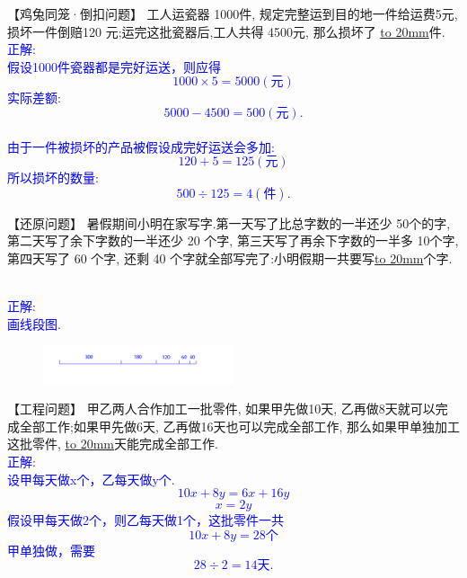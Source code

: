 \item {
    【鸡兔同笼·倒扣问题】
    工人运瓷器 1000件, 规定完整运到目的地一件给运费5元, 损坏一件倒赔120 元;运完这批瓷器后,工人共得 4500元, 那么损坏了 \underline{\hbox to 20mm{}}件.
    \ifshowSolution{}
        \fangsong{}\textcolor{blue}{
            \\正解:\\
            假设1000件瓷器都是完好运送，则应得\\
            \[1000\times 5 = 5000(元)\]
            实际差额: 
            \[5000-4500=500(元).\] \\
            由于一件被损坏的产品被假设成完好运送会多加:
            \[120+5=125(元)\]
            所以损坏的数量:
            \[500\div 125 = 4(件).\]
        }
    \else
        \vspace{2cm}
    \fi
}

\item {
    【还原问题】
    暑假期间小明在家写字.第一天写了比总字数的一半还少 50个的字, 第二天写了余下字数的一半还少 20 个字, 第三天写了再余下字数的一半多 10个字, 第四天写了 60 个字, 还剩 40 个字就全部写完了:小明假期一共要写\underline{\hbox to 20mm{}}个字.
    \ifshowSolution{}
        \fangsong{}\textcolor{blue}{
            \\正解:\\
            画线段图.
            \begin{figure}[H] 
                \centering
                \includegraphics[width=0.5\textwidth]{./pics/Chapter_3/seikai_9.png}
            \end{figure}
        }
    \else
        \vspace{2cm}
    \fi
}

\item {
    【工程问题】
    甲乙两人合作加工一批零件, 如果甲先做10天, 乙再做8天就可以完成全部工作;如果甲先做6天, 乙再做16天也可以完成全部工作, 那么如果甲单独加工这批零件, \underline{\hbox to 20mm{}}天能完成全部工作.
    \ifshowSolution{}
        \fangsong{}\textcolor{blue}{
            \\正解:\\
            设甲每天做x个，乙每天做y个.\\
            \[
                10x+8y = 6x+16y
            \]
            \[
                x= 2y
            \]
            假设甲每天做2个，则乙每天做1个，这批零件一共
            \[
                10x+8y = 28 个
            \]
            甲单独做，需要
            \[
                28\div 2 = 14天.
            \]
        }
    \else
        \vspace{2cm}
    \fi
}

